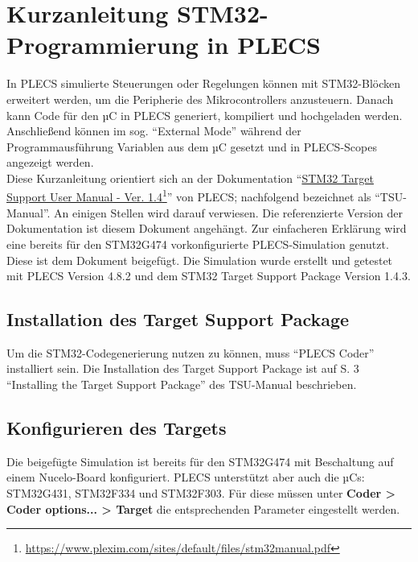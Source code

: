 \documentclass[a4paper,11pt,oneside]{article}
\begin{document}
\pagestyle{fancy}
\fancyhf{}
\section*{Kurzanleitung STM32-Programmierung in PLECS}
In PLECS simulierte Steuerungen oder Regelungen können mit STM32-Blöcken erweitert werden, um die Peripherie des Mikrocontrollers anzusteuern. Danach kann Code für den µC in PLECS generiert, kompiliert und hochgeladen werden. Anschließend können im sog. \enquote{External Mode} während der Programmausführung Variablen aus dem µC gesetzt und in PLECS-Scopes angezeigt werden. \\ 
Diese Kurzanleitung orientiert sich an der Dokumentation \enquote{\href{https://www.plexim.com/sites/default/files/stm32manual.pdf}{STM32 Target Support User Manual - Ver. 1.4}\footnote{\url{https://www.plexim.com/sites/default/files/stm32manual.pdf}}} von PLECS; nachfolgend bezeichnet als \enquote{TSU-Manual}. An einigen Stellen wird darauf verwiesen. Die referenzierte Version der Dokumentation ist diesem Dokument angehängt. Zur einfacheren Erklärung wird eine bereits für den STM32G474 vorkonfigurierte PLECS-Simulation genutzt. Diese ist dem Dokument beigefügt. Die Simulation wurde erstellt und getestet mit PLECS Version 4.8.2 und dem STM32 Target Support Package Version 1.4.3.
\subsection*{Installation des Target Support Package}
Um die STM32-Codegenerierung nutzen zu können, muss \enquote{PLECS Coder} installiert sein. Die Installation des Target Support Package ist auf S. 3 \enquote{Installing the Target Support Package} des TSU-Manual beschrieben. 
\subsection*{Konfigurieren des Targets}
Die beigefügte Simulation ist bereits für den STM32G474 mit Beschaltung auf einem Nucelo-Board konfiguriert. PLECS unterstützt aber auch die µCs: STM32G431, STM32F334 und STM32F303. Für diese müssen unter \textbf{Coder > Coder options... > Target} die entsprechenden Parameter eingestellt werden.
\end{document}
